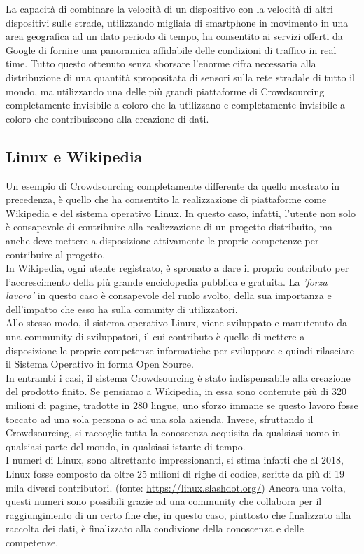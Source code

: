 La capacità di combinare la velocità di un dispositivo con la velocità di altri dispositivi sulle strade, utilizzando migliaia di smartphone in movimento in una area geografica ad un dato periodo di tempo, ha consentito ai servizi offerti da Google di fornire una panoramica affidabile delle condizioni di traffico in real time. Tutto questo ottenuto senza sborsare l'enorme cifra necessaria alla distribuzione di una quantità spropositata di sensori sulla rete stradale di tutto il mondo, ma utilizzando una delle più grandi piattaforme di Crowdsourcing completamente invisibile a coloro che la utilizzano e completamente invisibile a coloro che contribuiscono alla creazione di dati. \cite{patent:google_traffic_info}
\subsection{Linux e Wikipedia}
Un esempio di Crowdsourcing completamente differente da quello mostrato in precedenza, è quello che ha consentito la realizzazione di piattaforme come Wikipedia e del sistema operativo Linux.
In questo caso, infatti, l'utente non solo è consapevole di contribuire alla realizzazione di un progetto distribuito, ma anche deve mettere a disposizione attivamente le proprie competenze per contribuire al progetto.\\
In Wikipedia, ogni utente registrato, è spronato a dare il proprio contributo per l'accrescimento della più grande enciclopedia pubblica e gratuita. La \textit{'forza lavoro'} in questo caso è consapevole del ruolo svolto, della sua importanza e dell'impatto che esso ha sulla comunity di utilizzatori.\\
Allo stesso modo, il sistema operativo Linux, viene sviluppato e manutenuto da una community di sviluppatori, il cui contributo è quello di mettere a disposizione le proprie competenze informatiche per sviluppare e quindi rilasciare il Sistema Operativo in forma Open Source.\\
In entrambi i casi, il sistema Crowdsourcing è stato indispensabile alla creazione del prodotto finito.
Se pensiamo a Wikipedia, in essa sono contenute più di 320 milioni di pagine, tradotte in 280 lingue, uno sforzo immane se questo lavoro fosse toccato ad una sola persona o ad una sola azienda. Invece, sfruttando il Crowdsourcing, si raccoglie tutta la conoscenza acquisita da qualsiasi uomo in qualsiasi parte del mondo, in qualsiasi istante di tempo. \cite{book:wikistats}\\
I numeri di Linux, sono altrettanto impressionanti, si stima infatti che al 2018, Linux fosse composto da oltre 25 milioni di righe di codice, scritte da più di 19 mila diversi contributori. (fonte: \url{https://linux.slashdot.org/})
Ancora una volta, questi numeri sono possibili grazie ad una community che collabora per il raggiungimento di un certo fine che, in questo caso, piuttosto che finalizzato alla raccolta dei dati, è finalizzato alla condivione della conoscenza e delle competenze.

